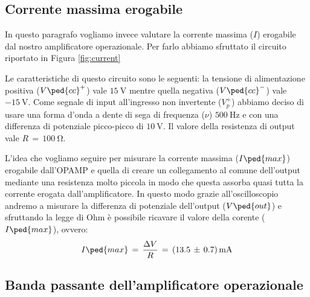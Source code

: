 
\subsection*{Corrente massima erogabile}

In questo paragrafo vogliamo invece valutare la corrente massima ($I$) erogabile dal nostro amplificatore operazionale. Per farlo abbiamo sfruttato il circuito riportato in Figura \ref{fig:current}

Le caratteristiche di questo circuito sono le seguenti: la tensione di alimentazione positiva ($V\ped{cc}^+$) vale $\SI{+15}{\volt}$ mentre quella negativa ($V\ped{cc}^-$) vale $\SI{-15}{\volt}$. Come segnale di input all'ingresso non invertente ($V_p^+$) abbiamo deciso di usare una forma d'onda a dente di sega di frequenza ($\nu$) $\SI{500}{\hertz}$ e con una differenza di potenziale picco-picco di $\SI{10}{\volt}$. Il valore della resistenza di output vale $R\,=\,\SI{100}{\ohm}$.

L'idea che vogliamo seguire per misurare la corrente massima ($I\ped{max}$) erogabile dall'OPAMP e quella di creare un collegamento al comune dell'output mediante una resistenza molto piccola in modo che questa assorba quasi tutta la corrente erogata dall'amplificatore. In questo modo grazie all'oscilloscopio andremo a misurare la differenza di potenziale dell'output ($V\ped{out}$) e sfruttando la legge di Ohm è possibile ricavare il valore della corente ($I\ped{max}$), ovvero:
\begin{equation}
	I\ped{max}\,=\,\frac{\Delta V}{R}\,=\,(13.5\,\pm\,0.7)\,\SI{}{\milli\ampere}
\end{equation}

\subsection*{Banda passante dell'amplificatore operazionale}

